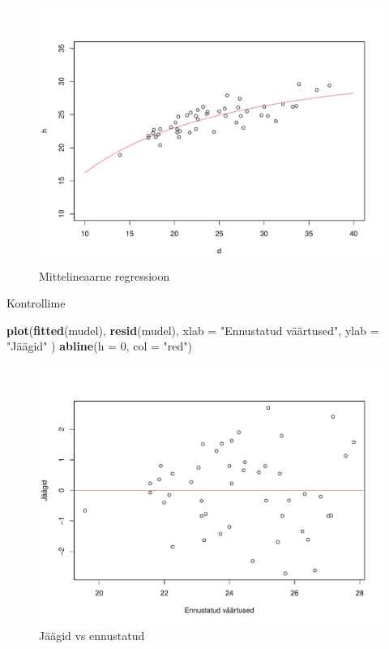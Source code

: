 \documentclass[
]{book}
\newenvironment{Shaded}{\begin{snugshade}}{\end{snugshade}}
\newcommand{\AttributeTok}[1]{\textcolor[rgb]{0.13,0.29,0.53}{#1}}
\newcommand{\DecValTok}[1]{\textcolor[rgb]{0.00,0.00,0.81}{#1}}
\newcommand{\FunctionTok}[1]{\textcolor[rgb]{0.13,0.29,0.53}{\textbf{#1}}}
\newcommand{\NormalTok}[1]{#1}
\newcommand{\StringTok}[1]{\textcolor[rgb]{0.31,0.60,0.02}{#1}}
\renewenvironment{Shaded} {\begin{snugshade}\footnotesize} {\end{snugshade}}
\begin{document}
\begin{figure}[!ht]
\includegraphics[width=0.8\linewidth]{_main_files/figure-latex/unnamed-chunk-79-1} \caption{Mittelineaarne regressioon}\label{fig:unnamed-chunk-79}
\end{figure}

Kontrollime

\begin{Shaded}
\begin{Highlighting}[]
\FunctionTok{plot}\NormalTok{(}\FunctionTok{fitted}\NormalTok{(mudel), }\FunctionTok{resid}\NormalTok{(mudel),}
 \AttributeTok{xlab =} \StringTok{"Ennustatud väärtused"}\NormalTok{,}
 \AttributeTok{ylab =} \StringTok{"Jäägid"}
\NormalTok{ )}
\FunctionTok{abline}\NormalTok{(}\AttributeTok{h =} \DecValTok{0}\NormalTok{, }\AttributeTok{col =} \StringTok{"red"}\NormalTok{)}
\end{Highlighting}
\end{Shaded}

\begin{figure}[!ht]
\includegraphics[width=0.8\linewidth]{_main_files/figure-latex/unnamed-chunk-80-1} \caption{Jäägid vs ennustatud}\label{fig:unnamed-chunk-80}
\end{figure}
\end{document}

